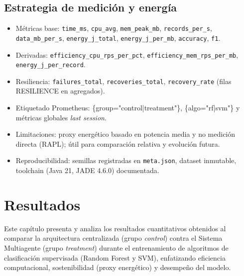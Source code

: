 \documentclass[12pt,oneside]{report}
\begin{document}
\section{Estrategia de medición y energía}
\begin{itemize}
    \item Métricas base: \texttt{time\_ms}, \texttt{cpu\_avg}, \texttt{mem\_peak\_mb}, \texttt{records\_per\_s}, \texttt{data\_mb\_per\_s}, \texttt{energy\_j\_total}, \texttt{energy\_j\_per\_mb}, \texttt{accuracy}, \texttt{f1}.
    \item Derivadas: \texttt{efficiency\_cpu\_rps\_per\_pct}, \texttt{efficiency\_mem\_rps\_per\_mb}, \texttt{energy\_j\_per\_record}.
    \item Resiliencia: \texttt{failures\_total}, \texttt{recoveries\_total}, \texttt{recovery\_rate} (filas RESILIENCE en agregados).
    \item Etiquetado Prometheus: \{group="control|treatment"\}, \{algo="rf|svm"\} y métricas globales \emph{last session}.
    \item Limitaciones: proxy energético basado en potencia media y no medición directa (RAPL); útil para comparación relativa y evolución futura.
    \item Reproducibilidad: semillas registradas en \texttt{meta.json}, dataset inmutable, toolchain (Java 21, JADE 4.6.0) documentada.
\end{itemize}

    \chapter{Resultados}
    \label{chap:resultados}
    Este capítulo presenta y analiza los resultados cuantitativos obtenidos al comparar la arquitectura centralizada (grupo \emph{control}) contra el Sistema Multiagente (grupo \emph{treatment}) durante el entrenamiento de algoritmos de clasificación supervisada (Random Forest y SVM), enfatizando eficiencia computacional, sostenibilidad (proxy energético) y desempeño del modelo.
\end{document}

